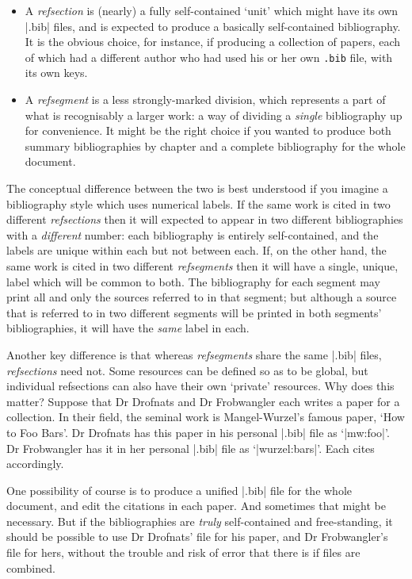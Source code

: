 \begin{itemize}
\item A \emph{refsection} is (nearly) a fully self-contained `unit'
  which might have its own |.bib| files, and is expected to produce a
  basically self-contained bibliography. It is the obvious choice, for
  instance, if producing a collection of papers, each of which had a
  different author who had used his or her own \texttt{.bib} file,
  with its own keys.
\item A \emph{refsegment} is a less strongly-marked division, which
  represents a part of what is recognisably a larger work: a way of
  dividing a \emph{single} bibliography up for convenience. It might
  be the right choice if you wanted to produce both summary
  bibliographies by chapter and a complete bibliography for the whole
  document.
\end{itemize}
The conceptual difference between the two is best understood if you
imagine a bibliography style which uses numerical labels. If the same
work is cited in two different \emph{refsections} then it will
expected to appear in two different bibliographies with a
\emph{different} number: each bibliography is entirely self-contained,
and the labels are unique within each but not between each. If, on the
other hand, the same work is cited in two different \emph{refsegments}
then it will have a single, unique, label which will be common to
both.  The bibliography for each segment may print all and only the
sources referred to in that segment; but although a source that is
referred to in two different segments will be printed in both
segments' bibliographies, it will have the \emph{same} label in each.

Another key difference is that whereas \emph{refsegments} share the
same |.bib| files, \emph{refsections} need not.  Some resources can be
defined so as to be global, but individual refsections can also have
their own `private' resources. Why does this matter? Suppose that Dr
Drofnats and Dr Frobwangler each writes a paper for a collection. In
their field, the seminal work is Mangel-Wurzel's famous paper, `How to
Foo Bars'. Dr Drofnats has this paper in his personal |.bib| file as
`|mw:foo|'. Dr Frobwangler has it in her personal |.bib| file as
`|wurzel:bars|'. Each cites accordingly.

One possibility of course is to produce a unified |.bib| file for the
whole document, and edit the citations in each paper. And sometimes
that might be necessary. But if the bibliographies are \emph{truly}
self-contained and free-standing, it should be possible to use Dr
Drofnats' file for his paper, and Dr Frobwangler's file for hers,
without the trouble and risk of error that there is if files are
combined.

